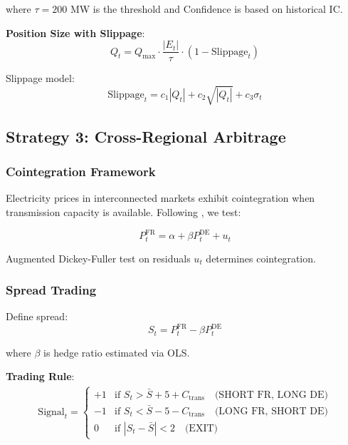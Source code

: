 \documentclass[12pt,a4paper]{article}
\begin{document}
where $\tau = 200$ MW is the threshold and Confidence is based on historical IC.

\textbf{Position Size with Slippage}:
\begin{equation}
Q_t = Q_{\max} \cdot \frac{|E_t|}{\tau} \cdot (1 - \text{Slippage}_t)
\end{equation}

Slippage model:
\begin{equation}
\text{Slippage}_t = c_1 |Q_t| + c_2 \sqrt{|Q_t|} + c_3 \sigma_t
\end{equation}

\subsection{Strategy 3: Cross-Regional Arbitrage}

\subsubsection{Cointegration Framework}

Electricity prices in interconnected markets exhibit cointegration when transmission capacity is available. Following \cite{engle1987co}, we test:

\begin{equation}
P_t^{\text{FR}} = \alpha + \beta P_t^{\text{DE}} + u_t
\end{equation}

Augmented Dickey-Fuller test on residuals $u_t$ determines cointegration.

\subsubsection{Spread Trading}

Define spread:
\begin{equation}
S_t = P_t^{\text{FR}} - \beta P_t^{\text{DE}}
\end{equation}

where $\beta$ is hedge ratio estimated via OLS.

\textbf{Trading Rule}:
\begin{align}
\text{Signal}_t = \begin{cases}
+1 & \text{if } S_t > \bar{S} + 5 + C_{\text{trans}} \quad \text{(SHORT FR, LONG DE)} \\
-1 & \text{if } S_t < \bar{S} - 5 - C_{\text{trans}} \quad \text{(LONG FR, SHORT DE)} \\
0 & \text{if } |S_t - \bar{S}| < 2 \quad \text{(EXIT)}
\end{cases}
\end{align}
\end{document}
